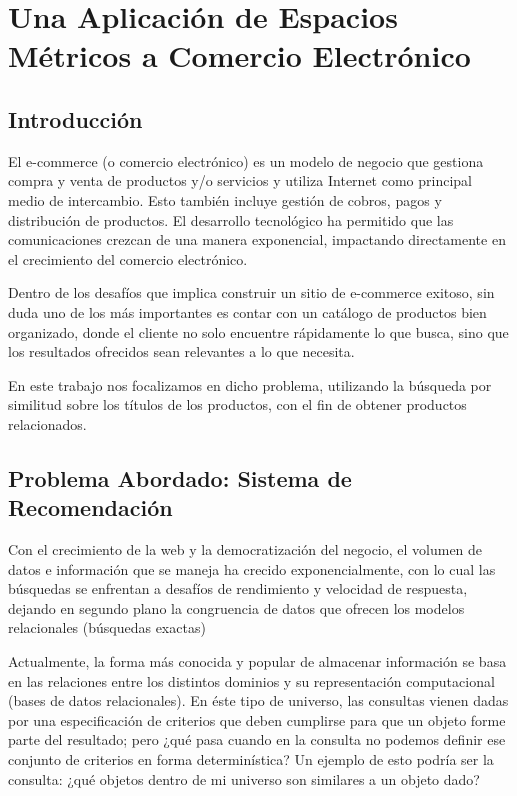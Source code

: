 \chapter{Una Aplicaci\'on de Espacios M\'etricos a Comercio Electr\'onico}

\section{Introducci\'on}

El e-commerce (o comercio electr\'onico) es un modelo de negocio que gestiona compra y venta de productos y/o servicios  y utiliza Internet como principal medio de intercambio. Esto tambi\'en incluye gesti\'on de cobros, pagos y distribuci\'on de productos. El desarrollo tecnol\'ogico ha permitido que las comunicaciones crezcan de una manera exponencial, impactando directamente en el crecimiento del comercio electr\'onico.

Dentro de los desaf\'ios que implica construir un sitio de e-commerce exitoso, sin duda uno de los m\'as importantes es contar con un cat\'alogo de productos bien organizado, donde el cliente no solo encuentre r\'apidamente lo que busca, sino que los resultados ofrecidos sean relevantes a lo que necesita. 

En este trabajo nos focalizamos en dicho problema, utilizando la b\'usqueda por similitud sobre los t\'itulos de los productos, con el fin de obtener productos relacionados.

\section{Problema Abordado: Sistema de Recomendaci\'on}

Con el crecimiento de la web y la democratizaci\'on del negocio, el volumen de datos e informaci\'on que se maneja ha crecido exponencialmente, con lo cual las b\'usquedas se enfrentan a desaf\'ios de rendimiento y velocidad de respuesta, dejando en segundo plano la congruencia de datos que ofrecen los modelos relacionales (b\'usquedas exactas)

Actualmente, la forma m\'as conocida y popular de almacenar informaci\'on se basa en las relaciones entre los distintos dominios y su representaci\'on computacional (bases de datos relacionales). En \'este tipo de universo, las consultas vienen dadas por una especificaci\'on de criterios que deben cumplirse para que un objeto forme parte del resultado; pero ¿qu\'e pasa cuando en la consulta no podemos definir ese conjunto de criterios en forma determin\'istica? Un ejemplo de esto podr\'ia ser la consulta: ¿qu\'e objetos dentro de mi universo son similares a un objeto dado?

